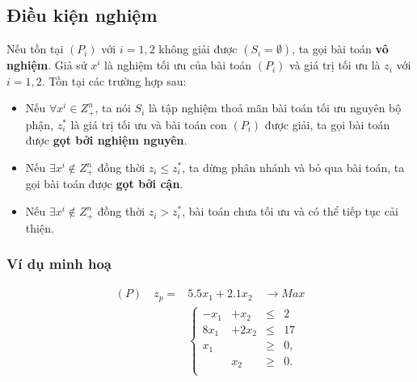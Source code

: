 \documentclass[12pt,a4paper]{report}
\begin{document}
\subsection*{Điều kiện nghiệm}
Nếu tồn tại $(P_i)$ với $i=1,2$ không giải được $(S_i = \emptyset )$, ta gọi bài toán \textbf{vô nghiệm}. Giả sử $x^i$ là nghiệm tối ưu của bài toán $(P_i)$ và giá trị tối ưu là $z_i$ với $i = 1,2$. Tồn tại các trường hợp sau:
\begin{itemize}
\item Nếu $\forall x^i \in Z^n_+$, ta nói $S_i$ là tập nghiệm thoả mãn bài toán tối ưu nguyên bộ phận, $z^*_i$ là giá trị tối ưu và bài toán con $(P_i)$ được giải, ta gọi bài toán được \textbf{gọt bởi nghiệm nguyên}.
\item Nếu $\exists x^i \notin Z^n_+$ đồng thời $z_i \leq z^*_i$, ta dừng phân nhánh và bỏ qua bài toán, ta gọi bài toán được \textbf{gọt bởi cận}.
\item Nếu $\exists x^i \notin Z^n_+$ đồng thời $z_i > z^*_i$, bài toán chưa tối ưu và có thể tiếp tục cải thiện.

\end{itemize}


\subsubsection*{Ví dụ minh hoạ}
    \begin{equation*}
        \begin{split}
            (P) \quad z_p= & 5.5x_1 + 2.1x_2 \quad \longrightarrow Max \\
            & \left\{\begin{array}{cccc}
            -x_1 &+ x_2 &\leq& 2 \\
            8x_1 &+ 2x_2 &\leq& 17 \\
            x_1 &&\geq& 0, \\
            &x_2 &\geq& 0. \\
            \end{array}\right. \\
        \end{split}
    \end{equation*}
\end{document}
